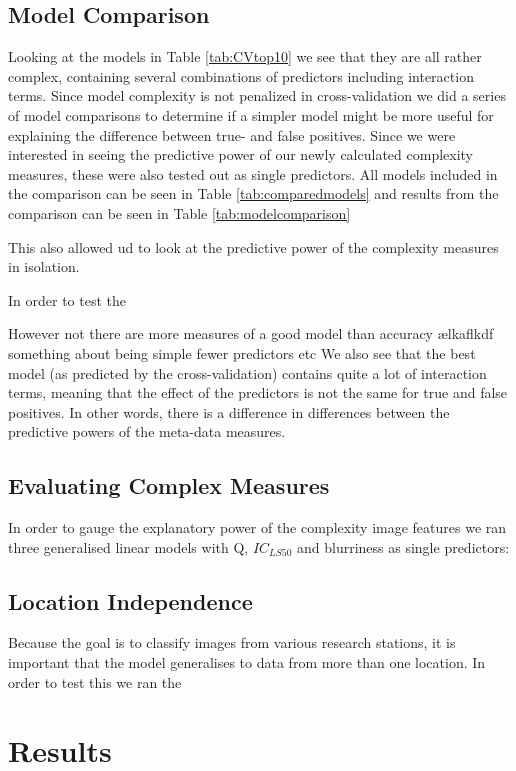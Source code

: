 \documentclass[12pt]{article}
\begin{document}
\subsection{Model Comparison}
Looking at the models in Table \ref{tab:CVtop10} we see that they are all rather complex, containing several combinations of predictors including interaction terms. Since model complexity is not penalized in cross-validation we did a series of model comparisons to determine if a simpler model might be more useful for explaining the difference between true- and false positives. Since we were interested in seeing the predictive power of our newly calculated complexity measures, these were also tested out as single predictors. All models included in the comparison can be seen in Table \ref{tab:comparedmodels} and results from the comparison can be seen in Table \ref{tab:modelcomparison}


This also allowed ud to look at the predictive power of the complexity measures in isolation.

In order to test the 

However not there are more measures of a good model than accuracy ælkaflkdf something about being simple fewer predictors etc
We also see that the best model (as predicted by the cross-validation) contains quite a lot of interaction terms, meaning that the effect of the predictors is not the same for true and false positives. In other words, there is a difference in differences between the predictive powers of the meta-data measures.

\subsection{Evaluating Complex Measures}
In order to gauge the explanatory power of the complexity image features we ran three generalised linear models with Q, $IC_{LS50}$ and blurriness as single predictors:




\subsection{Location Independence}
Because the goal is to classify images from various research stations, it is important that the model generalises to data from more than one location. In order to test this we ran the



\section{Results}
\end{document}
